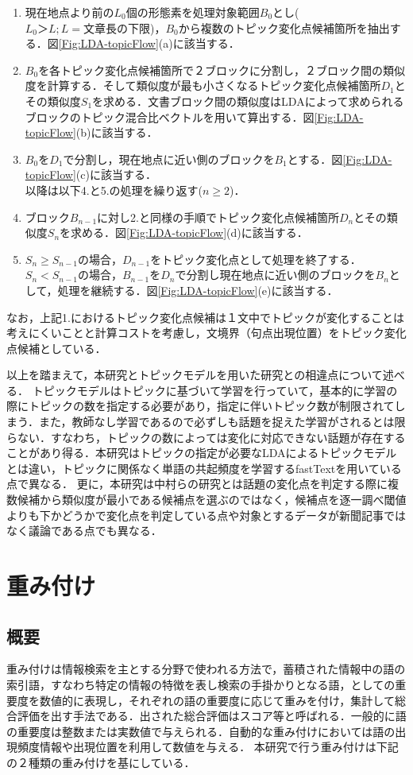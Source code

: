 \begin{enumerate}
  \item 現在地点より前の$L_0$個の形態素を処理対象範囲$B_0$とし($L_0＞L;L=文章長の下限$)，$B_0$から複数のトピック変化点候補箇所を抽出する．図\ref{Fig:LDA-topicFlow}(a)に該当する．
  \item $B_0$を各トピック変化点候補箇所で２ブロックに分割し，２ブロック間の類似度を計算する．そして類似度が最も小さくなるトピック変化点候補箇所$D_1$とその類似度$S_1$を求める．文書ブロック間の類似度はLDAによって求められるブロックのトピック混合比ベクトルを用いて算出する．図\ref{Fig:LDA-topicFlow}(b)に該当する．
  \item $B_0$を$D_1$で分割し，現在地点に近い側のブロックを$B_1$とする．図\ref{Fig:LDA-topicFlow}(c)に該当する．
  \\
  以降は以下4.と5.の処理を繰り返す($n\geq2$)．
  \item ブロック$B_{n-1}$に対し2.と同様の手順でトピック変化点候補箇所$D_n$とその類似度$S_n$を求める．図\ref{Fig:LDA-topicFlow}(d)に該当する．
  \item $S_n \geq S_{n-1}$の場合，$D_{n-1}$をトピック変化点として処理を終了する．$S_n <  S_{n-1}$の場合，$B_{n-1}$を$D_n$で分割し現在地点に近い側のブロックを$B_n$として，処理を継続する．図\ref{Fig:LDA-topicFlow}(e)に該当する．
\end{enumerate}
なお，上記1.におけるトピック変化点候補は１文中でトピックが変化することは考えにくいことと計算コストを考慮し，文境界（句点出現位置）をトピック変化点候補としている．

以上を踏まえて，本研究とトピックモデルを用いた研究との相違点について述べる．
トピックモデルはトピックに基づいて学習を行っていて，基本的に学習の際にトピックの数を指定する必要があり，指定に伴いトピック数が制限されてしまう．また，教師なし学習であるので必ずしも話題を捉えた学習がされるとは限らない．すなわち，トピックの数によっては変化に対応できない話題が存在することがあり得る．本研究はトピックの指定が必要なLDAによるトピックモデルとは違い，トピックに関係なく単語の共起頻度を学習するfastTextを用いている点で異なる．
更に，本研究は中村らの研究とは話題の変化点を判定する際に複数候補から類似度が最小である候補点を選ぶのではなく，候補点を逐一調べ閾値よりも下かどうかで変化点を判定している点や対象とするデータが新聞記事ではなく議論である点でも異なる．
\section{重み付け}
\label{rel:part:weight}
\subsection{概要}
\label{rel:part:weight:overview}
重み付けは情報検索を主とする分野で使われる方法で，蓄積された情報中の語の索引語，すなわち特定の情報の特徴を表し検索の手掛かりとなる語，としての重要度を数値的に表現し，それぞれの語の重要度に応じて重みを付け，集計して総合評価を出す手法である．出された総合評価はスコア等と呼ばれる．一般的に語の重要度は整数または実数値で与えられる．自動的な重み付けにおいては語の出現頻度情報や出現位置を利用して数値を与える．
本研究で行う重み付けは下記の２種類の重み付けを基にしている．
